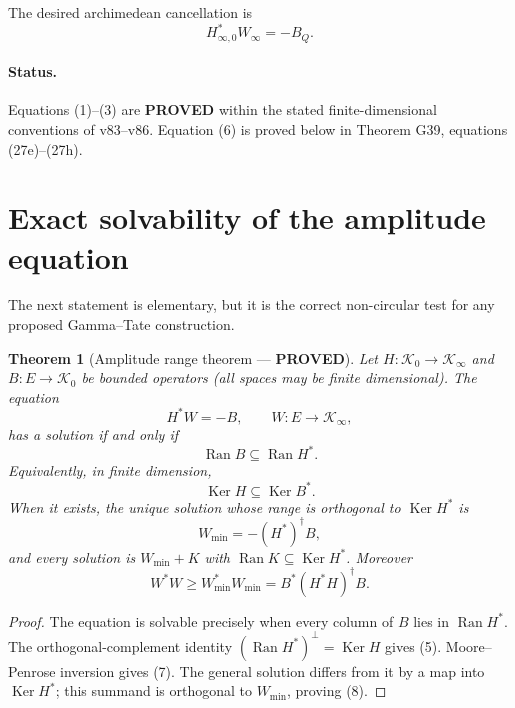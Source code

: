 \documentclass[11pt]{article}
\newtheorem{theorem}{Theorem}
\newcommand{\PROVED}{\textcolor{green!45!black}{\textbf{PROVED}}}
\newcommand{\Ran}{\operatorname{Ran}}
\newcommand{\Ker}{\operatorname{Ker}}
\begin{document}
The desired archimedean cancellation is
\begin{equation}
 H_{\infty,0}^*W_\infty=-B_Q.                            \tag{6}
\end{equation}

\paragraph{Status.} Equations (1)--(3) are \PROVED{} within the stated
finite-dimensional conventions of v83--v86.  Equation (6) is proved below in
Theorem G39, equations (27e)--(27h).

\section{Exact solvability of the amplitude equation}

The next statement is elementary, but it is the correct non-circular test for
any proposed Gamma--Tate construction.

\begin{theorem}[Amplitude range theorem --- \PROVED]
Let $H:\mathcal K_0\to\mathcal K_\infty$ and
$B:E\to\mathcal K_0$ be bounded operators (all spaces may be finite
dimensional).  The equation
\[
 H^*W=-B,\qquad W:E\to\mathcal K_\infty,
\]
has a solution if and only if
\begin{equation}
 \Ran B\subseteq\Ran H^*.                                \tag{4}
\end{equation}
Equivalently, in finite dimension,
\begin{equation}
 \Ker H\subseteq\Ker B^*.                               \tag{5}
\end{equation}
When it exists, the unique solution whose range is orthogonal to $\Ker H^*$ is
\begin{equation}
 W_{\min}=-(H^*)^\dagger B,                              \tag{7}
\end{equation}
and every solution is $W_{\min}+K$ with $\Ran K\subseteq\Ker H^*$.  Moreover
\begin{equation}
 W^*W\ge W_{\min}^*W_{\min}
 =B^*(H^*H)^\dagger B.                                  \tag{8}
\end{equation}
\end{theorem}

\begin{proof}
The equation is solvable precisely when every column of $B$ lies in
$\Ran H^*$.  The orthogonal-complement identity
$(\Ran H^*)^\perp=\Ker H$ gives (5).  Moore--Penrose inversion gives (7).
The general solution differs from it by a map into $\Ker H^*$; this summand is
orthogonal to $W_{\min}$, proving (8).
\end{proof}
\end{document}
